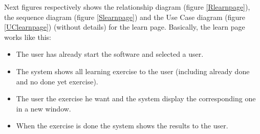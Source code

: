 Next figures respectively shows the relationship diagram (figure \ref{Rlearnpage}), the sequence diagram (figure \ref{Slearnpage}) and the Use Case diagram (figure \ref{UClearnpage}) (without details) for the learn page. Basically, the learn page works like this:
\begin{itemize}
\item The user has already start the software and selected a user.
\item The system shows all learning exercise to the user (including already done and no done yet exercise).
\item The user the exercise he want and the system display the corresponding one in a new window.
\item When the exercise is done the system shows the results to the user.
\end{itemize}

